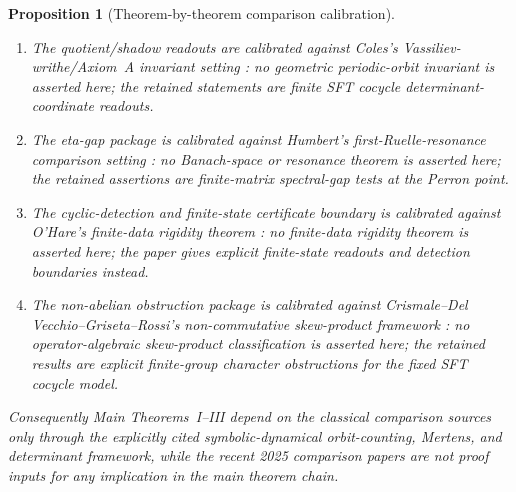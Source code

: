 \documentclass[11pt,a4paper]{amsart}
\theoremstyle{plain}
\newtheorem{proposition}[theorem]{Proposition}
\theoremstyle{definition}
\theoremstyle{remark}
\begin{document}
\begin{proposition}[Theorem-by-theorem comparison calibration]
\begin{enumerate}[label=\textup{(\alph*)},leftmargin=*]
    is calibrated against ordinary Artin--Ruelle determinant analogues in the
    symbolic-dynamical lineage \cite{ParryPollicott1990Zeta}: the contribution
    proved here is the Adams-corrected fixed-label Euler value
    \(F_\varrho(\lambda^{-1})\), its determinant recovery, and the obstruction
    to replacing it by \(\mathcal L_\varrho(\lambda^{-1})\).
    \item The quotient/shadow readouts
     are calibrated
    against Coles's Vassiliev-writhe/Axiom~A invariant setting
    \cite{Coles2025VassilievWritheAxiomA}: no geometric periodic-orbit
    invariant is asserted here; the retained statements are finite SFT cocycle
    determinant-coordinate readouts.
    \item The eta-gap package
    is calibrated against Humbert's first-Ruelle-resonance comparison setting
    \cite{Humbert2025FirstRuelleResonance}: no Banach-space or resonance
    theorem is asserted here; the retained assertions are finite-matrix
    spectral-gap tests at the Perron point.
    \item The cyclic-detection and finite-state certificate boundary
    is calibrated against O'Hare's finite-data rigidity theorem
    \cite{OHare2025FiniteDataRigidity}: no finite-data rigidity theorem is
    asserted here; the paper gives explicit finite-state readouts and detection
    boundaries instead.
    \item The non-abelian obstruction package
    is calibrated against Crismale--Del Vecchio--Griseta--Rossi's
    non-commutative skew-product framework
    \cite{CrismaleDelVecchioGrisetaRossi2025NoncommutativeSkewProduct}: no
    operator-algebraic skew-product classification is asserted here; the
    retained results are explicit finite-group character obstructions for the
    fixed SFT cocycle model.
  \end{enumerate}
  Consequently Main Theorems~I--III depend on the classical comparison sources
  only through the explicitly cited symbolic-dynamical orbit-counting,
  Mertens, and determinant framework, while the recent 2025 comparison papers
  are not proof inputs for any implication in the main theorem chain.
\end{proposition}
\end{document}
